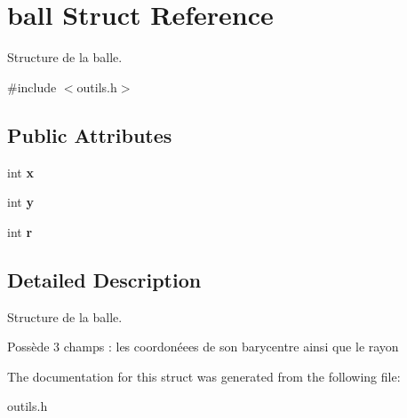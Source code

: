 \hypertarget{structball}{}\section{ball Struct Reference}
\label{structball}


Structure de la balle.  




{\ttfamily \#include $<$outils.\+h$>$}

\subsection*{Public Attributes}
\begin{DoxyCompactItemize}
\item 
int {\bfseries x}\hypertarget{structball_a09a8961fc7d8d508d2f0788e5c90d7fe}{}\label{structball_a09a8961fc7d8d508d2f0788e5c90d7fe}

\item 
int {\bfseries y}\hypertarget{structball_add1d5ee497a6bc9a2290a7d14f6865ea}{}\label{structball_add1d5ee497a6bc9a2290a7d14f6865ea}

\item 
int {\bfseries r}\hypertarget{structball_ae0067c6a0b7331de71209d14f0d9a488}{}\label{structball_ae0067c6a0b7331de71209d14f0d9a488}

\end{DoxyCompactItemize}


\subsection{Detailed Description}
Structure de la balle. 

Possède 3 champs \+: les coordonéees de son barycentre ainsi que le rayon 

The documentation for this struct was generated from the following file\+:\begin{DoxyCompactItemize}
\item 
outils.\+h\end{DoxyCompactItemize}
